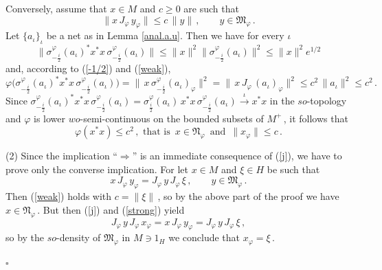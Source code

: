 \documentclass[reqno]{amsart}
\theoremstyle{definition}
\theoremstyle{remark}
\numberwithin{equation}{section}
\theoremstyle{plain}
\begin{document}
Conversely, assume that $x\in M$ and $c\geq 0$ are such that
\begin{equation}\label{weak}
\| x\, J_\varphi\, y_\varphi\|\leq c\,\| y\|\, ,\qquad y\in
\mathfrak M_\varphi\, .
\end{equation}
Let $\{ a_\iota\}_\iota$ be a net as in Lemma \ref{anal.a.u}.
Then we have for every $\iota$
\begin{equation*}
\| \sigma^\varphi_{-\frac i2} (a_\iota )^* x^*x\,
\sigma^\varphi_{-\frac i2} (a_\iota )\|\leq \| x\|^2
\| \sigma^\varphi_{-\frac i2} (a_\iota )\|^2\leq \| x\|^2
e^{1/2}
\end{equation*}
and, according to (\ref{-1/2}) and (\ref{weak}),
\begin{equation*}
\varphi\big( \sigma^\varphi_{-\frac i2} (a_\iota )^* x^*x\,
\sigma^\varphi_{-\frac i2} (a_\iota )\big) =\|\, x\,
\sigma^\varphi_{-\frac i2} (a_\iota )_\varphi\|^2 =\|\, x\,
J_\varphi\, (a_\iota )_\varphi\|^2\leq c^2\,\| a_\iota \|^2\leq
c^2\, .
\end{equation*}
Since $\sigma^\varphi_{-\frac i2} (a_\iota )^* x^*x\,
\sigma^\varphi_{-\frac i2} (a_\iota ) =
\sigma^\varphi_{\frac i2} (a_\iota )\, x^*x\,
\sigma^\varphi_{-\frac i2} (a_\iota )
\overset{\iota}{\longrightarrow} x^*x$ in the $so$-topology and
$\varphi$ is lower $wo$-semi-continuous on the bounded subsets
of $M^+\,$, it follows that
\begin{equation*}
\varphi (x^*x)\leq c^2\, ,\text{ that is }\, x\in
\mathfrak N_\varphi\,\text{ and }\,\| x_\varphi\|\leq c\, .
\end{equation*}

(2) Since the implication ``$\Longrightarrow$'' is an immediate
consequence of (\ref{j}), we have to prove only the converse
implication. For let $x\in M$ and $\xi\in H$ be such that
\begin{equation}\label{strong}
x\, J_\varphi\, y_\varphi =J_\varphi\, y\, J_\varphi\,\xi\, ,
\qquad y\in\mathfrak M_\varphi\, .
\end{equation}
Then (\ref{weak}) holds with $c=\|\xi\|\,$, so by the above part
of the proof we have $x\in\mathfrak N_\varphi\,$. But then
(\ref{j}) and (\ref{strong}) yield
\begin{equation*}
J_\varphi\, y\, J_\varphi\, x_\varphi =x\, J_\varphi\, y_\varphi
= J_\varphi\, y\, J_\varphi\,\xi\, ,
\end{equation*}
so by the $so$-density of $\mathfrak M_\varphi$ in $M\ni 1_H$
we conclude that $x_\varphi =\xi\,$.

\hfill $\square\quad$
\end{document}
